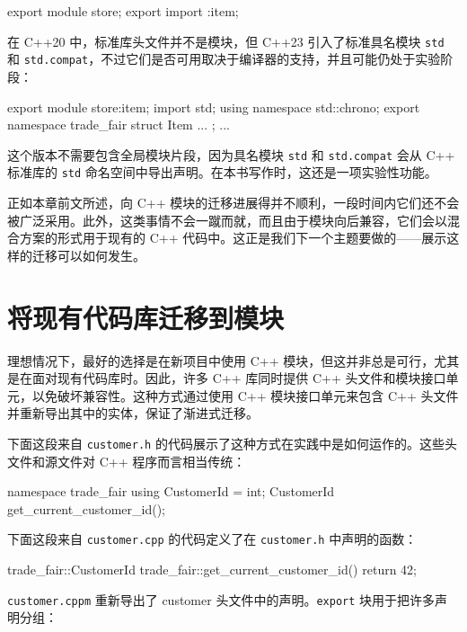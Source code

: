 \begin{codebox}[text]
export module store;
export import :item;
\end{codebox}

\label{idx:762}
在 C++20 中，标准库头文件并不是模块，但 C++23 引入了标准具名模块 \texttt{std} 和 \texttt{std.\allowbreak{}compat}，不过它们是否可用取决于编译器的支持，并且可能仍处于实验阶段：

\begin{codebox}[cpp]
export module store:item;
import std;
using namespace std::chrono;
export namespace trade_fair {
struct Item {
  ...
};
...
}
\end{codebox}

这个版本不需要包含全局模块片段，因为具名模块 \texttt{std} 和 \texttt{std.\allowbreak{}compat} 会从 C++ 标准库的 \texttt{std} 命名空间中导出声明。在本书写作时，这还是一项实验性功能。

正如本章前文所述，向 C++ 模块的迁移进展得并不顺利，一段时间内它们还不会被广泛采用。此外，这类事情不会一蹴而就，而且由于模块向后兼容，它们会以混合方案的形式用于现有的 C++ 代码中。这正是我们下一个主题要做的——展示这样的迁移可以如何发生。

\section{将现有代码库迁移到模块}

\label{idx:763}
\label{idx:764}
理想情况下，最好的选择是在新项目中使用 C++ 模块，但这并非总是可行，尤其是在面对现有代码库时。因此，许多 C++ 库同时提供 C++ 头文件和模块接口单元，以免破坏兼容性。这种方式通过使用 C++ 模块接口单元来包含 C++ 头文件并重新导出其中的实体，保证了渐进式迁移。

\label{idx:765}
下面这段来自 \texttt{customer.\allowbreak{}h} 的代码展示了这种方式在实践中是如何运作的。这些头文件和源文件对 C++ 程序而言相当传统：

\begin{codebox}[text]
namespace trade_fair {
using CustomerId = int;
CustomerId get_current_customer_id();
}
\end{codebox}

下面这段来自 \texttt{customer.\allowbreak{}cpp} 的代码定义了在 \texttt{customer.\allowbreak{}h} 中声明的函数：

\begin{codebox}[text]
trade_fair::CustomerId trade_fair::get_current_customer_id() { return 42; }
\end{codebox}

\label{idx:766}
\texttt{customer.\allowbreak{}cppm} 重新导出了 customer 头文件中的声明。\texttt{export} 块用于把许多声明分组：

